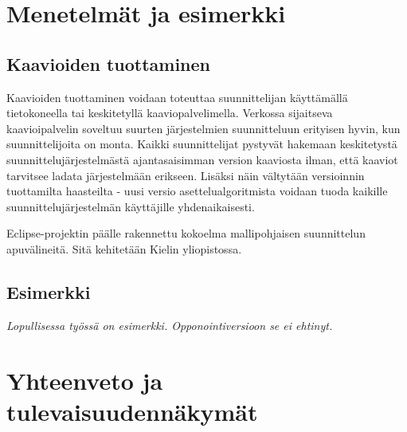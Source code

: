 \documentclass[finnish,12pt]{article}
\begin{document}
	\clearpage
	\section{Menetelmät ja esimerkki}

		\subsection{Kaavioiden tuottaminen}

Kaavioiden tuottaminen voidaan toteuttaa suunnittelijan käyttämällä tietokoneella tai keskitetyllä kaaviopalvelimella.
Verkossa sijaitseva kaavioipalvelin soveltuu suurten järjestelmien suunnitteluun erityisen hyvin, kun suunnittelijoita on monta.
Kaikki suunnittelijat pystyvät hakemaan keskitetystä suunnittelujärjestelmästä ajantasaisimman version kaaviosta ilman, että kaaviot tarvitsee ladata järjestelmään erikseen.
Lisäksi näin vältytään versioinnin tuottamilta haasteilta - uusi versio asettelualgoritmista voidaan tuoda kaikille suunnittelujärjestelmän käyttäjille yhdenaikaisesti.

Eclipse-projektin päälle rakennettu kokoelma mallipohjaisen suunnittelun apuvälineitä. Sitä kehitetään Kielin yliopistossa.

		\subsection{Esimerkki}

		\emph{Lopullisessa työssä on esimerkki. Opponointiversioon se ei ehtinyt.}







	\clearpage

	\section{Yhteenveto ja tulevaisuudennäkymät}
\end{document}
